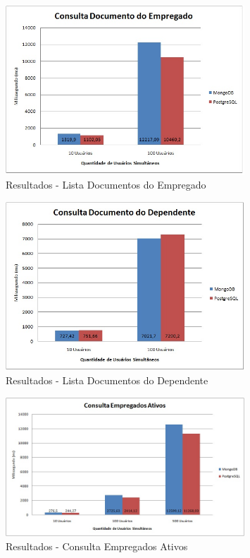 \begin{figure}[!htbp]
	\begin{center}
		\includegraphics[width=0.8\textwidth]{resultados/consulta_doc_empregado}
	\end{center}
	\caption{Resultados - Lista Documentos do Empregado}
	\label{fig:resultlistadocempregado}
\end{figure}

\begin{figure}[!htbp]
	\begin{center}
		\includegraphics[width=0.8\textwidth]{resultados/consulta_doc_dependente}
	\end{center}
	\caption{Resultados - Lista Documentos do Dependente}
	\label{fig:resultlistadocdependente}
\end{figure}

\begin{figure}[!htbp]
	\begin{center}
		\includegraphics[width=0.8\textwidth]{resultados/consulta_estatistica}
	\end{center}
	\caption{Resultados - Consulta Empregados Ativos}
	\label{fig:resultlistaempregadosativos}
\end{figure}

